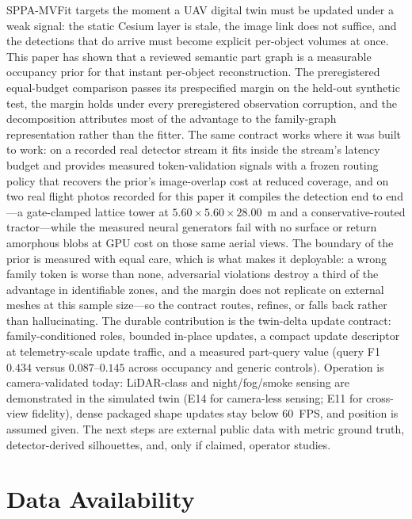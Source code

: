 \documentclass[11pt,a4paper]{article}
\begin{document}
SPPA-MVFit targets the moment a UAV digital twin must be updated under a weak
signal: the static Cesium layer is stale, the image link does not suffice,
and the detections that do arrive must become explicit per-object volumes at
once. This paper has shown that a reviewed semantic part graph is a
measurable occupancy prior for that instant per-object reconstruction. The
preregistered equal-budget comparison passes its prespecified margin on the
held-out synthetic test, the margin holds under every preregistered
observation corruption, and the decomposition attributes most of the
advantage to the family-graph representation rather than the fitter. The
same contract works where it was built to work: on a recorded real detector
stream it fits inside the stream's latency budget and provides measured
token-validation signals with a frozen routing policy that recovers the
prior's image-overlap cost at reduced coverage, and on two real flight
photos recorded for this
paper it compiles the detection end to end---a gate-clamped lattice tower at
\(5.60\times5.60\times28.00\)~m and a conservative-routed tractor---while
the measured neural generators fail with no surface or return amorphous
blobs at GPU cost on those same aerial views. The boundary of the prior is
measured with equal care, which is what makes it deployable: a wrong family
token is worse than none, adversarial violations destroy a third of the
advantage in identifiable zones, and the margin does not replicate on
external meshes at this sample size---so the contract routes, refines, or
falls back rather than hallucinating. The durable contribution is the
twin-delta update contract: family-conditioned roles, bounded in-place
updates, a compact update descriptor at telemetry-scale update traffic,
and a measured part-query value (query F1 \(0.434\) versus
\(0.087\)--\(0.145\) across occupancy and generic controls). Operation is
camera-validated today: LiDAR-class and night/fog/smoke sensing are
demonstrated in the simulated twin (E14 for camera-less sensing; E11 for
cross-view fidelity), dense packaged shape updates stay below 60~FPS, and
position is assumed given. The next steps are external public data with
metric ground truth, detector-derived silhouettes, and, only if claimed,
operator studies.

\section*{Data Availability}
\end{document}
